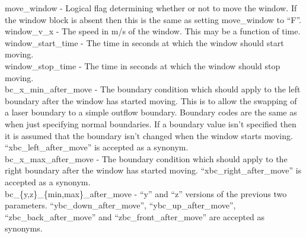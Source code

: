 {\emphtext move\_window} - Logical flag determining whether or not to move the
  window. If the window block is absent then this is the same as setting
  move\_window to ``F''.\\

{\emphtext window\_v\_x} - The speed in m/s of the window. This may be a
  function of time.\\

{\emphtext window\_start\_time} - The time in seconds at which the window should
  start moving.\\

{\emphtext window\_stop\_time} - The time in seconds at which the window should
  stop moving.\\

{\emphtext bc\_x\_min\_after\_move} - The boundary condition which should apply
  to the left boundary after the window has started moving. This is to allow
  the swapping of a laser boundary to a simple outflow boundary. Boundary codes
  are the same as when just specifying normal boundaries. If a boundary value
  isn't specified then it is assumed that the boundary isn't changed when the
  window starts moving. ``xbc\_left\_after\_move'' is accepted as a synonym.\\

{\emphtext bc\_x\_max\_after\_move} - The boundary condition which should apply
  to the right boundary after the window has started moving.
  ``xbc\_right\_after\_move'' is accepted as a synonym.\\

{\emphtext bc\_\{y,z\}\_\{min,max\}\_after\_move} - ``y'' and ``z'' versions of
  the previous two parameters.
  ``ybc\_down\_after\_move'', ``ybc\_up\_after\_move'',
  ``zbc\_back\_after\_move'' and ``zbc\_front\_after\_move'' are accepted as
  synonyms.\\

